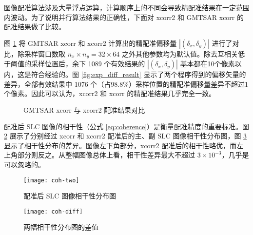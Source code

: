 图像配准算法涉及大量浮点运算，计算顺序上的不同会导致精配准结果在一定范围内波动。为了说明并行算法结果的正确性，下面对 xcorr2 和 GMTSAR xcorr 的配准结果做了比较。

图 \ref{fig:exp_result} 将 GMTSAR xcorr 和 xcorr2 计算出的精配准偏移量 $|(\delta_x, \delta_y)|$ 进行了对比，除采样窗口数取 $n_x\times n_y = 32 \times 64$ 之外其他参数均为默认值。除去互相关低于阈值的采样位置后，余下 1089 个有效结果的 $|(\delta_x, \delta_y)|$ 基本都在10个像素以内，这是符合经验的。图 \ref{fig:exp_diff_result} 显示了两个程序得到的偏移矢量的差异，全部有效结果中 1076 个（占98.8\%）采样位置的精配准偏移量差异不超过1个像素。因此可以认为，xcorr2 和 xcorr 的精配准结果几乎完全一致。

\begin{figure}[htbp]
\centering
{}
\caption{GMTSAR xcorr 与 xcorr2 配准结果对比} \label{fig:exp_result}
\end{figure}

配准后 SLC 图像的相干性（公式 \ref{eq:coherence}）是衡量配准精度的重要标准。图 \ref{fig:coh-two} 展示了分别经过 xcorr 和 xcorr2 配准后的主、副 SLC 图像相干性分布图，图 \ref{fig:coh-diff} 显示了相干性分布的差异。图像左下角部分，xcorr2 配准后的相干性略优，而左上角部分则反之。从整幅图像总体上看，相干性差异最大不超过 $3 \times 10^{-3}$，几乎是可以忽略的。

\begin{figure}[htbp]
\centering
\texttt{[image: coh-two]}
\caption{配准后 SLC 图像相干性分布图} \label{fig:coh-two}
\end{figure}


\begin{figure}[htbp]
\centering
\texttt{[image: coh-diff]}
\caption{两幅相干性分布图的差值} \label{fig:coh-diff}
\end{figure}
